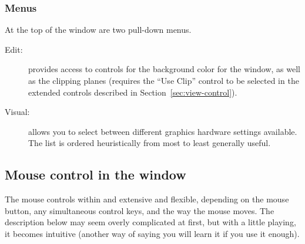 \subsubsection{Menus}

At the top of the \viewer{} window are two pull-down menus.
\begin{description}
  \item [Edit: ] provides access to controls for the background color for
        the window, as well as the clipping planes (requires the ``Use
        Clip'' control to be selected in the extended controls described in
        Section~\ref{sec:view-control}).
  \item [Visual: ] allows you to select between different graphics hardware
        settings available.  The list is ordered heuristically from
        most to least generally useful.
\end{description}

\subsection{Mouse control in the \viewer{} window}
\label{sec:view-mouse} 

The mouse controls within \SR{} and extensive and flexible, depending on
the mouse button, any simultaneous control keys, and the way the mouse
moves.  The description below may seem overly complicated at first, but
with a little playing, it becomes intuitive (another way of saying you will
learn it if you use it enough).

